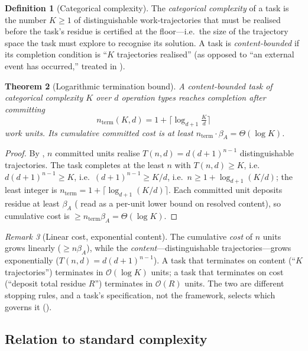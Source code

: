 \documentclass[twocolumn,10pt,a4paper]{article}
\theoremstyle{thmstyle}
\newtheorem{theorem}{Theorem}[section]
\theoremstyle{definition}
\newtheorem{definition}[theorem]{Definition}
\theoremstyle{remark}
\newtheorem{remark}[theorem]{Remark}
\newcommand{\floor}{\beta}
\begin{document}
\begin{definition}[Categorical complexity]
\label{def:complexity}
The \emph{categorical complexity} of a task is the number $K\ge 1$ of
distinguishable work-trajectories that must be realised before the task's
residue is certified at the floor---i.e.\ the size of the trajectory
space the task must explore to recognise its solution. A task is
\emph{content-bounded} if its completion condition is ``$K$ trajectories
realised'' (as opposed to ``an external event has occurred,'' treated in
).
\end{definition}

\begin{theorem}[Logarithmic termination bound]
\label{thm:termination}
A content-bounded task of categorical complexity $K$ over $d$ operation
types reaches completion after committing
\[
n_{\mathrm{term}}(K,d)=1+\Big\lceil\log_{d+1}\!\tfrac{K}{d}\Big\rceil
\]
work units. Its cumulative committed cost is at least
$n_{\mathrm{term}}\cdot\floor_A=\Theta(\log K)$.
\end{theorem}

\begin{proof}
By , $n$ committed units realise $T(n,d)=d(d+1)^{n-1}$
distinguishable trajectories. The task completes at the least $n$ with
$T(n,d)\ge K$, i.e.\ $d(d+1)^{n-1}\ge K$, i.e.\ $(d+1)^{n-1}\ge K/d$,
i.e.\ $n\ge 1+\log_{d+1}(K/d)$; the least integer is
$n_{\mathrm{term}}=1+\lceil\log_{d+1}(K/d)\rceil$. Each committed unit
deposits residue at least $\floor_A$ ( read as a
per-unit lower bound on resolved content), so cumulative cost is
$\ge n_{\mathrm{term}}\floor_A=\Theta(\log K)$.
\end{proof}

\begin{remark}[Linear cost, exponential content]
\label{rem:asymmetry}
The cumulative \emph{cost} of $n$ units grows linearly ($\ge n\floor_A$),
while the \emph{content}---distinguishable trajectories---grows
exponentially ($T(n,d)=d(d+1)^{n-1}$). A task that terminates on content
(``$K$ trajectories'') terminates in $\mathcal{O}(\log K)$ units; a task
that terminates on cost (``deposit total residue $R$'') terminates in
$\mathcal{O}(R)$ units. The two are different stopping rules, and a task's
specification, not the framework, selects which governs it
().
\end{remark}

\subsection{Relation to standard complexity}
\label{sec:complexity-standard}
\end{document}
